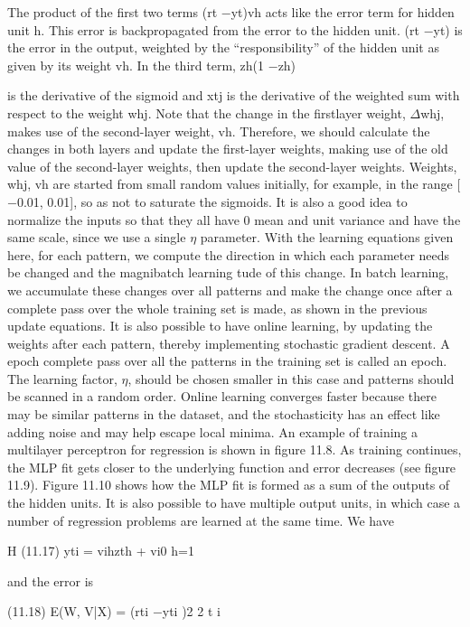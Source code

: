 The product of the first two terms (rt $-$yt)vh acts like the error term for hidden unit h. This error is backpropagated from the error to the hidden unit. (rt $-$yt) is the error in the output, weighted by the “responsibility” of the hidden unit as given by its weight vh. In the third term, zh(1 $-$zh)

is the derivative of the sigmoid and xtj is the derivative of the weighted sum with respect to the weight whj. Note that the change in the firstlayer weight, $\Delta$whj, makes use of the second-layer weight, vh. Therefore, we should calculate the changes in both layers and update the first-layer weights, making use of the old value of the second-layer weights, then update the second-layer weights. Weights, whj, vh are started from small random values initially, for example, in the range [$-$0.01, 0.01], so as not to saturate the sigmoids. It is also a good idea to normalize the inputs so that they all have 0 mean and unit variance and have the same scale, since we use a single $\eta$ parameter. With the learning equations given here, for each pattern, we compute the direction in which each parameter needs be changed and the magnibatch learning tude of this change. In batch learning, we accumulate these changes over all patterns and make the change once after a complete pass over the whole training set is made, as shown in the previous update equations. It is also possible to have online learning, by updating the weights after each pattern, thereby implementing stochastic gradient descent. A epoch complete pass over all the patterns in the training set is called an epoch. The learning factor, $\eta$, should be chosen smaller in this case and patterns should be scanned in a random order. Online learning converges faster because there may be similar patterns in the dataset, and the stochasticity has an effect like adding noise and may help escape local minima. An example of training a multilayer perceptron for regression is shown in figure 11.8. As training continues, the MLP fit gets closer to the underlying function and error decreases (see figure 11.9). Figure 11.10 shows how the MLP fit is formed as a sum of the outputs of the hidden units. It is also possible to have multiple output units, in which case a number of regression problems are learned at the same time. We have

H (11.17) yti = vihzth + vi0 h=1

and the error is

(11.18) E(W, V|X) = (rti $-$yti )2 2 t i

